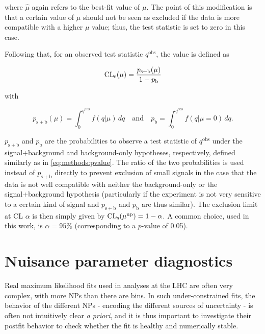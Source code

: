 \noindent where $\hat{\mu}$ again refers to the best-fit value of $\mu$. The point of this modification is that a certain value of $\mu$ should not be seen as excluded if the data is more compatible with a higher $\mu$ value; thus, the test statistic is set to zero in this case.

Following that, for an observed test statistic $q^{\mathrm{obs}}$, the \CLs value is defined as

\begin{equation}
\label{eq:methods:cls}
    \mathrm{CL}_{\mathrm{s}} (\mu) = \frac { p_{\mathrm{s+b}} (\mu) } { 1 - p_{\mathrm{b}} }
\end{equation}

\noindent with

\begin{equation}
    p_{\mathrm{s+b}} (\mu) = \int_0^{q^{\mathrm{obs}}} f(q | \mu) \, dq
    \quad \text{and} \quad
    p_{\mathrm{b}} = \int_0^{q^{\mathrm{obs}}} f(q | \mu = 0) \, dq.
\end{equation}

$p_{\mathrm{s+b}}$ and $p_{\mathrm{b}}$ are the probabilities to observe a test statistic of $q^{\mathrm{obs}}$ under the signal+background and background-only hypotheses, respectively, defined similarly as in \cref{eq:methods:pvalue}. The ratio of the two probabilities is used instead of $p_{\mathrm{s+b}}$ directly to prevent exclusion of small signals in the case that the data is not well compatible with neither the background-only or the signal+background hypothesis (particularly if the experiment is not very sensitive to a certain kind of signal and $p_{\mathrm{s+b}}$ and $p_{\mathrm{b}}$ are thus similar). The exclusion limit at CL $\alpha$ is then simply given by $\mathrm{CL}_{\mathrm{s}} (\mu^{\mathrm{up}}) = 1 - \alpha$. A common choice, used in this work, is $\alpha = 95\%$ (corresponding to a $p$-value of 0.05).

\section{Nuisance parameter diagnostics}

Real maximum likelihood fits used in analyses at the LHC are often very complex, with more NPs than there are bins. In such under-constrained fits, the behavior of the different NPs - encoding the different sources of uncertainty - is often not intuitively clear \textit{a priori}, and it is thus important to investigate their postfit behavior to check whether the fit is healthy and numerically stable.

